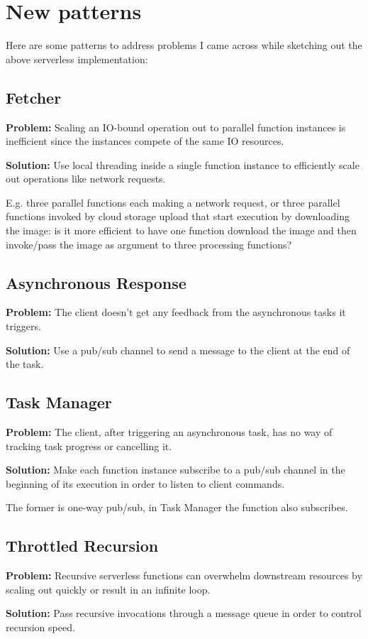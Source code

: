 \section{New patterns} \label{sec:newPatterns}

Here are some patterns to address problems I came across while sketching out the above serverless implementation:

\subsection{Fetcher} \label{subsec:Fetcher}

\textbf{Problem:} Scaling an IO-bound operation out to parallel function instances is inefficient since the instances compete of the same IO resources.

\textbf{Solution:} Use local threading inside a single function instance to efficiently scale out operations like network requests.

E.g. three parallel functions each making a network request, or three parallel functions invoked by cloud storage upload that start execution by downloading the image: is it more efficient to have one function download the image and then invoke/pass the image as argument to three processing functions?

\subsection{Asynchronous Response} \label{subsec:AsyncResponse}

\textbf{Problem:} The client doesn't get any feedback from the asynchronous tasks it triggers.

\textbf{Solution:} Use a pub/sub channel to send a message to the client at the end of the task.

\subsection{Task Manager} \label{subsec:taskManager}

\textbf{Problem:} The client, after triggering an asynchronous task, has no way of tracking task progress or cancelling it.

\textbf{Solution:} Make each function instance subscribe to a pub/sub channel in the beginning of its execution in order to listen to client commands.

The former is one-way pub/sub, in Task Manager the function also subscribes.

\subsection{Throttled Recursion} \label{subsec:throttledRecursion}

\textbf{Problem:} Recursive serverless functions can overwhelm downstream resources by scaling out quickly or result in an infinite loop.

\textbf{Solution:} Pass recursive invocations through a message queue in order to control recursion speed.
